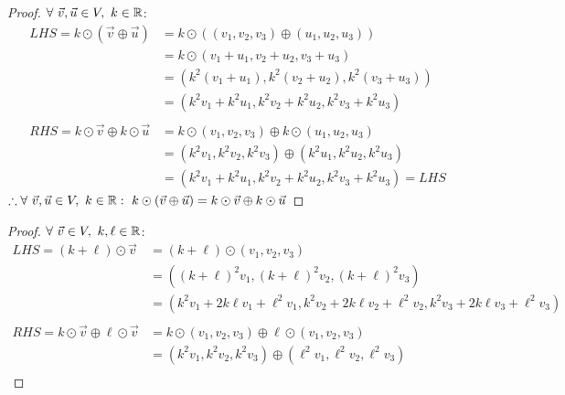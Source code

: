 \begin{enumerate}
  \begin{proof}
    $\forall~\vec{v},\vec{u} \in V,~k \in \mathbb{R}$:
    \begin{align*}
      LHS = k \odot (\vec{v} \oplus \vec{u})       & = k \odot ((v_1,v_2,v_3) \oplus (u_1,u_2,u_3))         \\
                                                   & = k \odot (v_1+u_1,v_2+u_2,v_3+u_3)                    \\
                                                   & = (k^2(v_1+u_1), k^2(v_2+u_2), k^2(v_3+u_3))           \\
                                                   & = (k^2v_1+k^2u_1,k^2v_2+k^2u_2,k^2v_3+k^2u_3)          \\ \\
      RHS = k \odot \vec{v} \oplus k \odot \vec{u} & = k \odot (v_1,v_2,v_3) \oplus k \odot (u_1,u_2,u_3)   \\
                                                   & = (k^2v_1,k^2v_2,k^2v_3) \oplus (k^2u_1,k^2u_2,k^2u_3) \\
                                                   & = (k^2v_1+k^2u_1,k^2v_2+k^2u_2,k^2v_3+k^2u_3) = LHS
    \end{align*}
    $\therefore \forall~\vec{v},\vec{u} \in V,~k \in \mathbb{R}:~k \odot (\vec{v} \oplus \vec{u}) = k \odot \vec{v} \oplus k \odot \vec{u}$
  \end{proof}
  \begin{proof}
    $\forall~\vec{v} \in V,~k,\ell \in \mathbb{R}$:
    \begin{align*}
      LHS = (k+\ell) \odot \vec{v}                    & = (k+\ell) \odot (v_1,v_2,v_3)                                                          \\
                                                      & = ((k+\ell)^2v_1,(k+\ell)^2v_2,(k+\ell)^2v_3)                                           \\
                                                      & = (k^2v_1+2k\ell v_1+\ell^2v_1,k^2v_2+2k\ell v_2+\ell^2v_2,k^2v_3+2k\ell v_3+\ell^2v_3) \\ \\
      RHS = k \odot \vec{v} \oplus \ell \odot \vec{v} & = k \odot (v_1,v_2,v_3) \oplus \ell \odot (v_1,v_2,v_3)                                 \\
                                                      & = (k^2v_1,k^2v_2,k^2v_3) \oplus (\ell^2v_1,\ell^2v_2,\ell^2v_3)                         \\

\end{align*}
\end{proof}
\end{enumerate}
